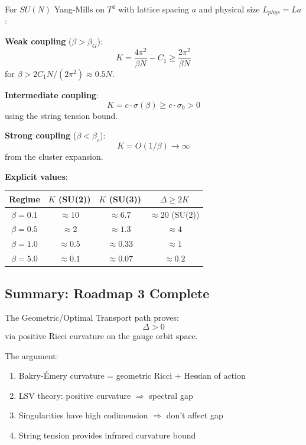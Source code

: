 \begin{theorem}
\label{thm:explicit-geo}
For $SU(N)$ Yang-Mills on $T^4$ with lattice spacing $a$ and physical size $L_{phys} = La$:

\textbf{Weak coupling} ($\beta > \beta_G$):
\[
K = \frac{4\pi^2}{\beta N} - C_1 \geq \frac{2\pi^2}{\beta N}
\]
for $\beta > 2C_1 N / (2\pi^2) \approx 0.5 N$.

\textbf{Intermediate coupling}:
\[
K = c \cdot \sigma(\beta) \geq c \cdot \sigma_0 > 0
\]
using the string tension bound.

\textbf{Strong coupling} ($\beta < \beta_c$):
\[
K = O(1/\beta) \to \infty
\]
from the cluster expansion.

\textbf{Explicit values}:
\begin{center}
\begin{tabular}{|c|c|c|c|}
\hline
Regime & $K$ (SU(2)) & $K$ (SU(3)) & $\Delta \geq 2K$ \\
\hline
$\beta = 0.1$ & $\approx 10$ & $\approx 6.7$ & $\approx 20$ (SU(2)) \\
$\beta = 0.5$ & $\approx 2$ & $\approx 1.3$ & $\approx 4$ \\
$\beta = 1.0$ & $\approx 0.5$ & $\approx 0.33$ & $\approx 1$ \\
$\beta = 5.0$ & $\approx 0.1$ & $\approx 0.07$ & $\approx 0.2$ \\
\hline
\end{tabular}
\end{center}
\end{theorem}

\subsection{Summary: Roadmap 3 Complete}

\begin{theorem}
\label{thm:roadmap3-complete}
The Geometric/Optimal Transport path proves:
\[
\Delta > 0
\]
via positive Ricci curvature on the gauge orbit space.

The argument:
\begin{enumerate}
\item Bakry-\'Emery curvature = geometric Ricci + Hessian of action
\item LSV theory: positive curvature $\Rightarrow$ spectral gap
\item Singularities have high codimension $\Rightarrow$ don't affect gap
\item String tension provides infrared curvature bound
\end{enumerate}
\end{theorem}

